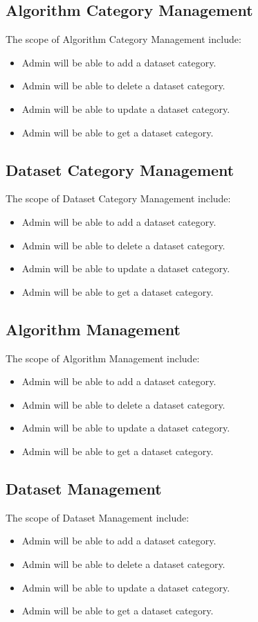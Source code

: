 \subsection{Algorithm Category Management}
The scope of Algorithm Category Management include:
\begin{itemize}
  \item Admin will be able to add a dataset category.
  \item Admin will be able to delete a dataset category.
  \item Admin will be able to update a dataset category.
  \item Admin will be able to get a dataset category.
\end{itemize}


\subsection{Dataset Category Management}
The scope of Dataset Category Management include:
\begin{itemize}
  \item Admin will be able to add a dataset category.
  \item Admin will be able to delete a dataset category.
  \item Admin will be able to update a dataset category.
  \item Admin will be able to get a dataset category.
\end{itemize}

\subsection{Algorithm Management}
The scope of Algorithm Management include:
\begin{itemize}
  \item Admin will be able to add a dataset category.
  \item Admin will be able to delete a dataset category.
  \item Admin will be able to update a dataset category.
  \item Admin will be able to get a dataset category.
\end{itemize}

\subsection{Dataset Management}
The scope of Dataset Management include:
\begin{itemize}
  \item Admin will be able to add a dataset category.
  \item Admin will be able to delete a dataset category.
  \item Admin will be able to update a dataset category.
  \item Admin will be able to get a dataset category.
\end{itemize}
